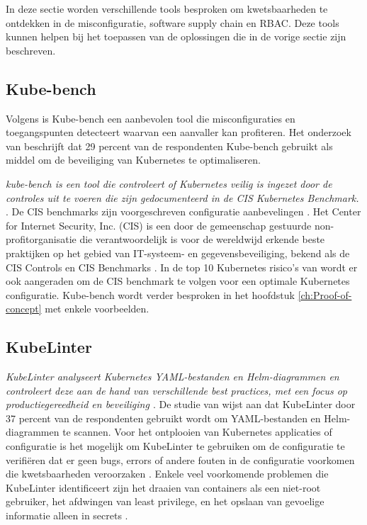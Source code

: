 In deze sectie worden verschillende tools besproken om kwetsbaarheden te ontdekken in de misconfiguratie, software supply chain en RBAC. Deze tools kunnen helpen bij het toepassen van de oplossingen die in de vorige sectie zijn beschreven.

\subsection{Kube-bench}
Volgens \textcite{mytilinakis2020attack} is Kube-bench een aanbevolen tool die misconfiguraties en toegangspunten detecteert waarvan een aanvaller kan profiteren. Het onderzoek van \textcite{red-hat-2023} beschrijft dat 29 percent van de respondenten Kube-bench gebruikt als middel om de beveiliging van Kubernetes te optimaliseren. 


\textit{kube-bench is een tool die controleert of Kubernetes veilig is ingezet door de controles uit te voeren die zijn gedocumenteerd in de CIS Kubernetes Benchmark. \autocite{aquasecurity-kube-bench-2023}}. De CIS benchmarks zijn voorgeschreven configuratie aanbevelingen \autocite{CIS-benchmark-2023}. Het Center for Internet Security, Inc. (CIS) is een door de gemeenschap gestuurde non-profitorganisatie die verantwoordelijk is voor de wereldwijd erkende beste praktijken op het gebied van IT-systeem- en gegevensbeveiliging, bekend als de CIS Controls en CIS Benchmarks \autocite{CIS-benchmark-2023}. In de top 10 Kubernetes risico's van \textcite{OWASP-2023} wordt er ook aangeraden om de CIS benchmark te volgen voor een optimale Kubernetes configuratie. Kube-bench wordt verder besproken in het hoofdstuk \ref{ch:Proof-of-concept} met enkele voorbeelden.
    
\subsection{KubeLinter}
\textit{KubeLinter analyseert Kubernetes YAML-bestanden en Helm-diagrammen en controleert deze aan de hand van verschillende best practices, met een focus op productiegereedheid en beveiliging \autocite{KubeLinterDocs}}. De studie van \textcite{red-hat-2023} wijst aan dat KubeLinter door 37 percent van de respondenten gebruikt wordt om YAML-bestanden en Helm-diagrammen te scannen. Voor het ontplooien van Kubernetes applicaties of configuratie is het mogelijk om KubeLinter te gebruiken om de configuratie te verifiëren dat er geen bugs, errors of andere fouten in de configuratie voorkomen die kwetsbaarheden veroorzaken \autocite{KubeLinterDocs}. Enkele veel voorkomende problemen die KubeLinter identificeert zijn het draaien van containers als een niet-root gebruiker, het afdwingen van least privilege, en het opslaan van gevoelige informatie alleen in secrets \autocite{KubeLinterDocs}. 


